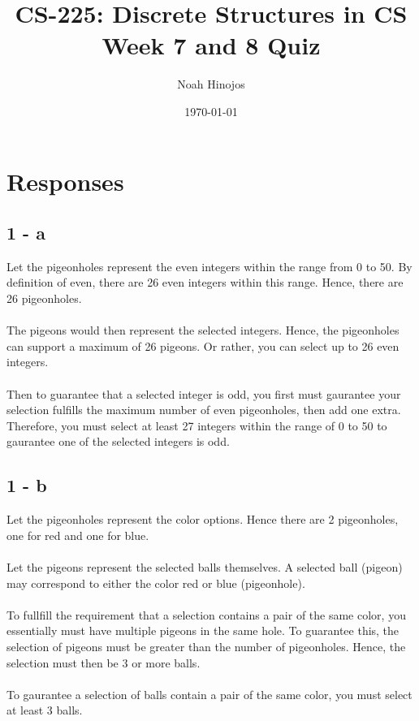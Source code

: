 \documentclass[12pt]{article}
\title{
  \textbf{CS-225: Discrete Structures in CS} \\
  Week 7 and 8 Quiz
  }
\author{Noah Hinojos}
\date{\today}
\begin{document}
\maketitle
\section*{Responses}
\subsection*{1 - a}
Let the pigeonholes represent the even integers within the range from 0 to 50. 
By definition of even, there are 26 even integers within this range. 
Hence, there are 26 pigeonholes.
\\ \\
The pigeons would then represent the selected integers. 
Hence, the pigeonholes can support a maximum of 26 pigeons.
Or rather, you can select up to 26 even integers.
\\ \\
Then to guarantee that a selected integer is odd, you first must gaurantee your selection fulfills the maximum number of even pigeonholes, then add one extra.
Therefore, you must select at least 27 integers within the range of 0 to 50 to gaurantee one of the selected integers is odd. 
\subsection*{1 - b}
Let the pigeonholes represent the color options. Hence there are 2 pigeonholes, one for red and one for blue.
\\ \\
Let the pigeons represent the selected balls themselves. A selected ball (pigeon) may correspond to either the color red or blue (pigeonhole).
\\ \\
To fullfill the requirement that a selection contains a pair of the same color, you essentially must have multiple pigeons in the same hole. 
To guarantee this, the selection of pigeons must be greater than the number of pigeonholes. Hence, the selection must then be 3 or more balls.
\\ \\
To gaurantee a selection of balls contain a pair of the same color, you must select at least 3 balls.
\end{document}
